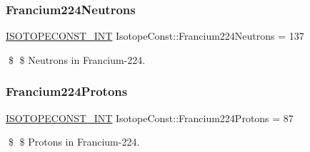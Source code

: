 \subsubsection{\texorpdfstring{Francium224\+Neutrons}{Francium224Neutrons}}
{\footnotesize\ttfamily \mbox{\hyperlink{group___isotope_const-_macros_ga5f18360b3e99483a35c32d789e62621c}{I\+S\+O\+T\+O\+P\+E\+C\+O\+N\+S\+T\+\_\+\+I\+NT}} Isotope\+Const\+::\+Francium224\+Neutrons = 137}

\$ \$ Neutrons in Francium-\/224. \mbox{\label{group___isotope_const-_francium-_fr224_ga93d73e3361483da4d60ea1ea2b7fd28b}} 
\subsubsection{\texorpdfstring{Francium224\+Protons}{Francium224Protons}}
{\footnotesize\ttfamily \mbox{\hyperlink{group___isotope_const-_macros_ga5f18360b3e99483a35c32d789e62621c}{I\+S\+O\+T\+O\+P\+E\+C\+O\+N\+S\+T\+\_\+\+I\+NT}} Isotope\+Const\+::\+Francium224\+Protons = 87}

\$ \$ Protons in Francium-\/224. 